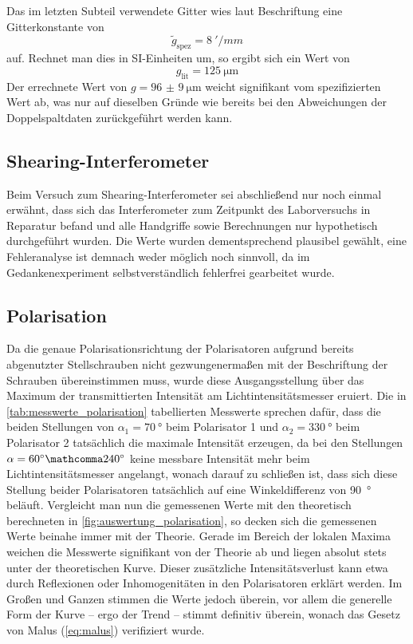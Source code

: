 \documentclass[ngerman]{scrartcl}
\begin{document}
Das im letzten Subteil verwendete Gitter wies laut Beschriftung eine Gitterkonstante von
\[\tilde{g}_{\text{spez}}=\SI{8}{'/mm}\]
auf. Rechnet man dies in SI-Einheiten um, so ergibt sich ein Wert von
\[g_{\text{lit}}=\SI{125}{\micro\meter}\]
Der errechnete Wert von \(g = \SI{96(9)}{\micro\meter}\) weicht signifikant vom spezifizierten Wert ab, was nur auf dieselben Gründe wie bereits bei den Abweichungen der Doppelspaltdaten zurückgeführt werden kann.


\subsection{Shearing-Interferometer}
\label{subsec:diskussion_shearing}

Beim Versuch zum Shearing-Interferometer sei abschließend nur noch einmal erwähnt, dass sich das Interferometer zum Zeitpunkt des Laborversuchs in Reparatur befand und alle Handgriffe sowie Berechnungen nur hypothetisch durchgeführt wurden. Die Werte wurden dementsprechend plausibel gewählt, eine Fehleranalyse ist demnach weder möglich noch sinnvoll, da im Gedankenexperiment selbstverständlich fehlerfrei gearbeitet wurde.


\subsection{Polarisation}
\label{subsec:diskussion_polarisation}

Da die genaue Polarisationsrichtung der Polarisatoren aufgrund bereits abgenutzter Stellschrauben nicht gezwungenermaßen mit der Beschriftung der Schrauben übereinstimmen muss, wurde diese Ausgangsstellung über das Maximum der transmittierten Intensität am Lichtintensitätsmesser eruiert. Die in \autoref{tab:messwerte_polarisation} tabellierten Messwerte sprechen dafür, dass die beiden Stellungen von $\alpha_1 = \SI{70}{\degree}$ beim Polarisator 1 und $\alpha_2 = \SI{330}{\degree}$ beim Polarisator 2 tatsächlich die maximale Intensität erzeugen, da bei den Stellungen $\alpha = \SI{60}{\degree} \mathcomma \SI{240}{\degree}$ keine messbare Intensität mehr beim Lichtintensitätsmesser angelangt, wonach darauf zu schließen ist, dass sich diese Stellung beider Polarisatoren tatsächlich auf eine Winkeldifferenz von \SI{90}{\degree} beläuft. Vergleicht man nun die gemessenen Werte mit den theoretisch berechneten in \autoref{fig:auswertung_polarisation}, so decken sich die gemessenen Werte beinahe immer mit der Theorie. Gerade im Bereich der lokalen Maxima weichen die Messwerte signifikant von der Theorie ab und liegen absolut stets unter der theoretischen Kurve. Dieser zusätzliche Intensitätsverlust kann etwa durch Reflexionen oder Inhomogenitäten in den Polarisatoren erklärt werden. Im Großen und Ganzen stimmen die Werte jedoch überein, vor allem die generelle Form der Kurve -- ergo der Trend -- stimmt definitiv überein, wonach das Gesetz von Malus (\autoref{eq:malus}) verifiziert wurde.
\end{document}
